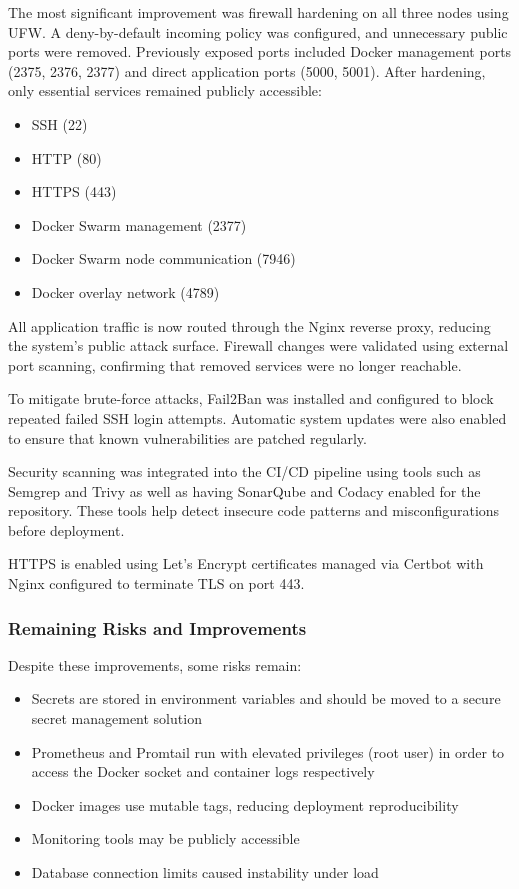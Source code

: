 The most significant improvement was firewall hardening on all three nodes using UFW. A deny-by-default incoming policy was configured, and unnecessary public ports were removed. Previously exposed ports included Docker management ports (2375, 2376, 2377) and direct application ports (5000, 5001). After hardening, only essential services remained publicly accessible:

\begin{itemize}
   \item SSH (22)
    \item HTTP (80)
    \item HTTPS (443)
    \item Docker Swarm management (2377)
    \item Docker Swarm node communication (7946)
    \item Docker overlay network (4789)
\end{itemize}

All application traffic is now routed through the Nginx reverse proxy, reducing the system's public attack surface. Firewall changes were validated using external port scanning, confirming that removed services were no longer reachable.

To mitigate brute-force attacks, Fail2Ban was installed and configured to block repeated failed SSH login attempts. Automatic system updates were also enabled to ensure that known vulnerabilities are patched regularly.

Security scanning was integrated into the CI/CD pipeline using tools such as Semgrep and Trivy as well as having SonarQube and Codacy enabled for the repository. These tools help detect insecure code patterns and misconfigurations before deployment.

 HTTPS is enabled using Let's Encrypt certificates managed via Certbot with Nginx configured to terminate TLS on port 443.

\subsubsection{Remaining Risks and Improvements}

Despite these improvements, some risks remain:

\begin{itemize}
    \item Secrets are stored in environment variables and should be moved to a secure secret management solution
    \item Prometheus and Promtail run with elevated privileges 
(root user) in order to access the Docker socket and 
container logs respectively
    \item Docker images use mutable tags, reducing deployment reproducibility
    \item Monitoring tools may be publicly accessible
    \item Database connection limits caused instability under load
\end{itemize}

